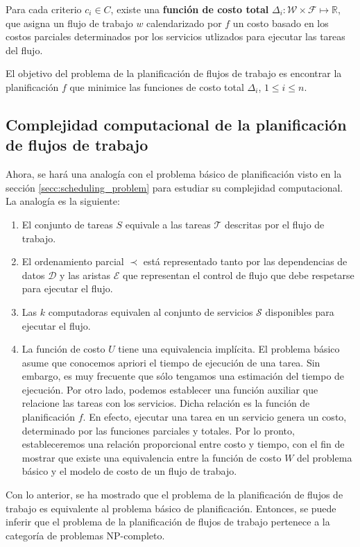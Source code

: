 \begin{defn}
Para cada criterio $c_i \in C$, existe una \textbf{función de costo total} $\Delta_i : \mathcal{W} \times \mathcal{F} \mapsto \mathbb{R}$, que asigna un flujo de trabajo $w$ calendarizado por $f$ un costo basado en los costos parciales determinados por los servicios utlizados para ejecutar las tareas del flujo.
\end{defn}

El objetivo del problema de la planificación de flujos de trabajo es encontrar la planificación $f$ que minimice las funciones de costo total $\Delta_i$, $1 \le i \le n$.

\subsection{Complejidad computacional de la planificación de flujos de trabajo}
Ahora, se hará una analogía con el problema básico de planificación visto en la sección \ref{secc:scheduling_problem} para estudiar su complejidad computacional. La analogía es la siguiente:


\begin{enumerate}
\item El conjunto de tareas $S$ equivale a las tareas $\mathcal{T}$ descritas por el flujo de trabajo.

\item El ordenamiento parcial $\prec$ está representado tanto por las dependencias de datos $\mathcal{D}$ y las aristas $\mathcal{E}$ que representan el control de flujo que debe respetarse para ejecutar el flujo.

\item Las $k$ computadoras equivalen al conjunto de servicios $\mathcal{S}$ disponibles para ejecutar el flujo.

\item La función de costo $U$ tiene una equivalencia implícita. El problema básico asume que conocemos apriori el tiempo de ejecución de una tarea. Sin embargo, es muy frecuente que sólo tengamos una estimación del tiempo de ejecución. Por otro lado, podemos establecer una función auxiliar que relacione las tareas con los servicios. Dicha relación es la función de planificación $f$. En efecto, ejecutar una tarea en un servicio genera un costo, determinado por las funciones parciales y totales. Por lo pronto, estableceremos una relación proporcional entre costo y tiempo, con el fin de mostrar que existe una equivalencia entre la función de costo $W$ del problema básico y el modelo de costo de un flujo de trabajo.
\end{enumerate}

Con lo anterior, se ha mostrado que el problema de la planificación de flujos de trabajo es equivalente al problema básico de planificación. Entonces, se puede inferir que el problema de la planificación de flujos de trabajo pertenece a la categoría de problemas NP-completo.

